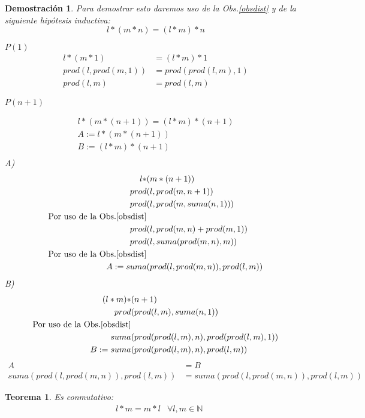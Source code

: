 \documentclass[9pt,a4paper,draft]{article}
\theoremstyle{definition}
\theoremstyle{plain}
\newtheorem{teo}{Teorema}
\newtheorem{demo}{Demostración}[teo]
\begin{document}
\begin{demo}
Para demostrar esto daremos uso de la Obs.\ref{obsdist} y de la siguiente hipótesis inductiva:\\

$$l*(m*n)=(l*m)*n$$

$P(1)$
\begin{align*}
l*(m*1) &= (l*m)*1\\
prod(l,prod(m,1)) &= prod(prod(l,m), 1)\\
prod(l,m) &= prod(l,m)
\end{align*}

$P(n+1)$

\begin{align*}
l*(m*(n+1)) = (l*m)*(n+1)\\
A := l*(m*(n+1))\\
B := (l*m)*(n+1)\\
\end{align*}
A)
\begin{align*}
l*&(m*(n+1))\\
prod&(l,prod(m,n+1))\\
prod&(l,prod(m,suma(n,1)))\\
\text{Por uso de la Obs.\ref{obsdist}}\\
prod&(l, prod(m,n)+prod(m,1))\\
prod&(l, suma(prod(m,n),m))\\
\text{Por uso de la Obs.\ref{obsdist}}\\
A := suma&(prod(l, prod(m,n)),prod(l,m))
\end{align*}
B)
\begin{align*}
(l*m)*&(n+1)\\
prod&(prod(l,m),suma(n,1))\\
\text{Por uso de la Obs.\ref{obsdist}}\\
suma&(prod(prod(l,m),n),prod(prod(l,m),1))\\
B := suma&(prod(prod(l,m),n),prod(l,m))\\
\end{align*}
\begin{align*}
A &= B\\
suma(prod(l, prod(m,n)),prod(l,m)) &= suma(prod(l, prod(m,n)),prod(l,m))
\end{align*}
\end{demo}

\begin{teo} \label{teomonpro}Es conmutativo:\\
\begin{align*} & l*m=m*l & \forall l,m\in{\mathbb{N}} \end{align*}
\end{teo}
\end{document}
